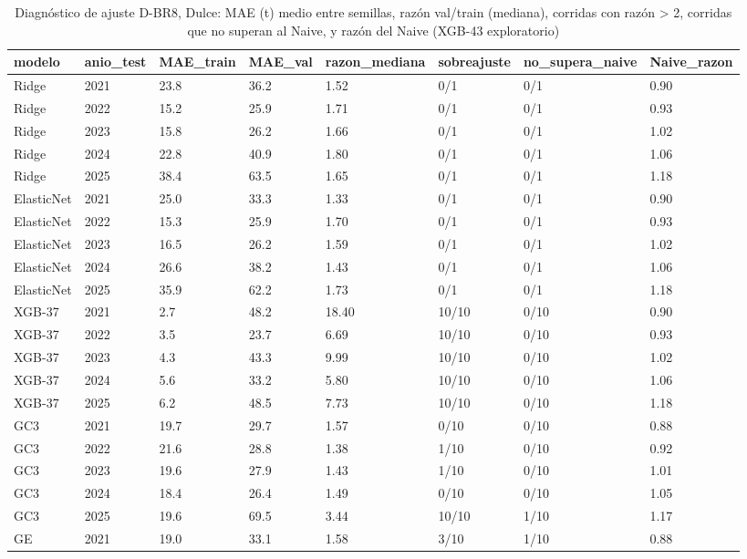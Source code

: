 \begin{table}[H]
\centering
\small
\caption{Diagnóstico de ajuste D-BR8, Dulce: MAE (t) medio entre semillas, razón val/train (mediana), corridas con razón > 2, corridas que no superan al Naive, y razón del Naive (XGB-43 exploratorio)}
\label{tab:T15_diagnostico_dulce}
\begin{tabular}{llllllll}
\toprule
modelo & anio\_test & MAE\_train & MAE\_val & razon\_mediana & sobreajuste & no\_supera\_naive & Naive\_razon \\
\midrule
Ridge & 2021 & 23.8 & 36.2 & 1.52 & 0/1 & 0/1 & 0.90 \\
Ridge & 2022 & 15.2 & 25.9 & 1.71 & 0/1 & 0/1 & 0.93 \\
Ridge & 2023 & 15.8 & 26.2 & 1.66 & 0/1 & 0/1 & 1.02 \\
Ridge & 2024 & 22.8 & 40.9 & 1.80 & 0/1 & 0/1 & 1.06 \\
Ridge & 2025 & 38.4 & 63.5 & 1.65 & 0/1 & 0/1 & 1.18 \\
ElasticNet & 2021 & 25.0 & 33.3 & 1.33 & 0/1 & 0/1 & 0.90 \\
ElasticNet & 2022 & 15.3 & 25.9 & 1.70 & 0/1 & 0/1 & 0.93 \\
ElasticNet & 2023 & 16.5 & 26.2 & 1.59 & 0/1 & 0/1 & 1.02 \\
ElasticNet & 2024 & 26.6 & 38.2 & 1.43 & 0/1 & 0/1 & 1.06 \\
ElasticNet & 2025 & 35.9 & 62.2 & 1.73 & 0/1 & 0/1 & 1.18 \\
XGB-37 & 2021 & 2.7 & 48.2 & 18.40 & 10/10 & 0/10 & 0.90 \\
XGB-37 & 2022 & 3.5 & 23.7 & 6.69 & 10/10 & 0/10 & 0.93 \\
XGB-37 & 2023 & 4.3 & 43.3 & 9.99 & 10/10 & 0/10 & 1.02 \\
XGB-37 & 2024 & 5.6 & 33.2 & 5.80 & 10/10 & 0/10 & 1.06 \\
XGB-37 & 2025 & 6.2 & 48.5 & 7.73 & 10/10 & 0/10 & 1.18 \\
GC3 & 2021 & 19.7 & 29.7 & 1.57 & 0/10 & 0/10 & 0.88 \\
GC3 & 2022 & 21.6 & 28.8 & 1.38 & 1/10 & 0/10 & 0.92 \\
GC3 & 2023 & 19.6 & 27.9 & 1.43 & 1/10 & 0/10 & 1.01 \\
GC3 & 2024 & 18.4 & 26.4 & 1.49 & 0/10 & 0/10 & 1.05 \\
GC3 & 2025 & 19.6 & 69.5 & 3.44 & 10/10 & 1/10 & 1.17 \\
GE & 2021 & 19.0 & 33.1 & 1.58 & 3/10 & 1/10 & 0.88 \\

\end{tabular}
\end{table}
